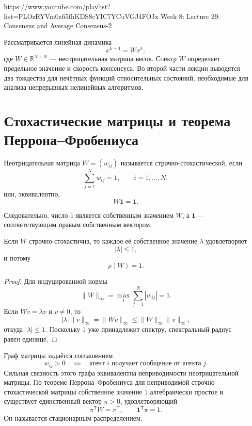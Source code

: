
\sourcevideo
    {https://www.youtube.com/playlist?list=PLOzRYVm0a65fhKDS8cYIC7YCuVGJ4FOJx}
    {Week 8: Lecture 29: Consensus and Average Consensus-2}

Рассматривается линейная динамика
\[
    x^{k+1}=Wx^k,
\]
где \(W\in\mathbb R^{N\times N}\) --- неотрицательная матрица
весов. Спектр \(W\) определяет предельное значение и скорость
консенсуса. Во второй части лекции выводятся два тождества для
нечётных функций относительных состояний, необходимые для анализа
непрерывных нелинейных алгоритмов.

\section{Стохастические матрицы и теорема Перрона--Фробениуса}

\begin{definition}
Неотрицательная матрица \(W=(w_{ij})\) называется
строчно-стохастической, если
\[
    \sum_{j=1}^{N}w_{ij}=1,
    \qquad i=1,\ldots,N,
\]
или, эквивалентно,
\[
    W\mathbf1=\mathbf1.
\]
\end{definition}

Следовательно, число \(1\) является собственным значением \(W\), а
\(\mathbf1\) --- соответствующим правым собственным вектором.

\begin{theorem}
Если \(W\) строчно-стохастична, то каждое её собственное значение
\(\lambda\) удовлетворяет
\[
    |\lambda|\le1,
\]
и потому
\[
    \rho(W)=1.
\]
\end{theorem}

\begin{proof}
Для индуцированной нормы
\[
    \lVert W\rVert_\infty
    =
    \max_i\sum_{j=1}^{N}|w_{ij}|
    =1.
\]
Если \(Wv=\lambda v\) и \(v\ne0\), то
\[
    |\lambda|\lVert v\rVert_\infty
    =
    \lVert Wv\rVert_\infty
    \le
    \lVert W\rVert_\infty\lVert v\rVert_\infty,
\]
откуда \(|\lambda|\le1\). Поскольку \(1\) уже принадлежит спектру,
спектральный радиус равен единице.
\end{proof}

Граф матрицы задаётся соглашением
\[
    w_{ij}>0
    \quad\Longleftrightarrow\quad
    \text{агент }i\text{ получает сообщение от агента }j.
\]
Сильная связность этого графа эквивалентна неприводимости
неотрицательной матрицы. По теореме Перрона--Фробениуса для
неприводимой строчно-стохастической матрицы собственное значение
\(1\) алгебраически простое и существует единственный вектор
\(\pi>0\), удовлетворяющий
\[
    \pi^{\mathsf T}W=\pi^{\mathsf T},
    \qquad
    \mathbf1^{\mathsf T}\pi=1.
\]
Он называется стационарным распределением.

